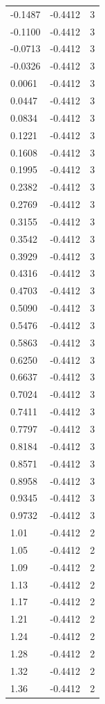 \begin{longtable}{lrr}
  -0.1487 & -0.4412 & 3 \\
  -0.1100 & -0.4412 & 3 \\
  -0.0713 & -0.4412 & 3 \\
  -0.0326 & -0.4412 & 3 \\
  0.0061 & -0.4412 & 3 \\
  0.0447 & -0.4412 & 3 \\
  0.0834 & -0.4412 & 3 \\
  0.1221 & -0.4412 & 3 \\
  0.1608 & -0.4412 & 3 \\
  0.1995 & -0.4412 & 3 \\
  0.2382 & -0.4412 & 3 \\
  0.2769 & -0.4412 & 3 \\
  0.3155 & -0.4412 & 3 \\
  0.3542 & -0.4412 & 3 \\
  0.3929 & -0.4412 & 3 \\
  0.4316 & -0.4412 & 3 \\
  0.4703 & -0.4412 & 3 \\
  0.5090 & -0.4412 & 3 \\
  0.5476 & -0.4412 & 3 \\
  0.5863 & -0.4412 & 3 \\
  0.6250 & -0.4412 & 3 \\
  0.6637 & -0.4412 & 3 \\
  0.7024 & -0.4412 & 3 \\
  0.7411 & -0.4412 & 3 \\
  0.7797 & -0.4412 & 3 \\
  0.8184 & -0.4412 & 3 \\
  0.8571 & -0.4412 & 3 \\
  0.8958 & -0.4412 & 3 \\
  0.9345 & -0.4412 & 3 \\
  0.9732 & -0.4412 & 3 \\
  1.01 & -0.4412 & 2 \\
  1.05 & -0.4412 & 2 \\
  1.09 & -0.4412 & 2 \\
  1.13 & -0.4412 & 2 \\
  1.17 & -0.4412 & 2 \\
  1.21 & -0.4412 & 2 \\
  1.24 & -0.4412 & 2 \\
  1.28 & -0.4412 & 2 \\
  1.32 & -0.4412 & 2 \\
  1.36 & -0.4412 & 2 \\

\end{longtable}
